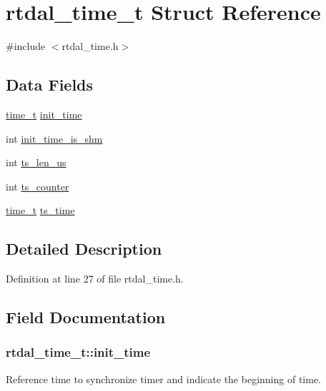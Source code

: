 \hypertarget{structrtdal__time__t}{\section{rtdal\-\_\-time\-\_\-t Struct Reference}
\label{structrtdal__time__t}
}


{\ttfamily \#include $<$rtdal\-\_\-time.\-h$>$}

\subsection*{Data Fields}
\begin{DoxyCompactItemize}
\item 
\hyperlink{rtdal__types_8h_a7157cbb87d46be33f7f913fa09144900}{time\-\_\-t} \hyperlink{structrtdal__time__t_a30d11b555cefce5c8982f5d759d8d0b5}{init\-\_\-time}
\item 
int \hyperlink{structrtdal__time__t_a13feacdb12d9a613582b8962634105b5}{init\-\_\-time\-\_\-is\-\_\-shm}
\item 
int \hyperlink{structrtdal__time__t_a7973db38c7e50480f7a2251a722b8661}{ts\-\_\-len\-\_\-us}
\item 
int \hyperlink{structrtdal__time__t_a89a3ee16ee59251793149c861efa7594}{ts\-\_\-counter}
\item 
\hyperlink{rtdal__types_8h_a7157cbb87d46be33f7f913fa09144900}{time\-\_\-t} \hyperlink{structrtdal__time__t_aa824a8a4634d0a302803df0694429cb0}{ts\-\_\-time}
\end{DoxyCompactItemize}


\subsection{Detailed Description}


Definition at line 27 of file rtdal\-\_\-time.\-h.



\subsection{Field Documentation}
\hypertarget{structrtdal__time__t_a30d11b555cefce5c8982f5d759d8d0b5}{
\subsubsection[{init\-\_\-time}]{ rtdal\-\_\-time\-\_\-t\-::init\-\_\-time}}\label{structrtdal__time__t_a30d11b555cefce5c8982f5d759d8d0b5}
Reference time to synchronize timer and indicate the beginning of time. 

